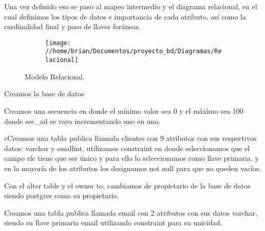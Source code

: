 \documentclass[letterpaper,12pt]{article}
\begin{document}
 	Una vez definido eso se paso al mapeo intermedio y el diagrama relacional, en el cual definimos los tipos de datos e importancia de cada atributo, así como la cardinalidad final y paso de llaves foráneas.
 	
 	\begin{figure}[H]

 		\begin{subfigure}{20cm}

 			\centering

 			\texttt{[image: //home/brian/Documentos/proyecto\_bd/Diagramas/Relacional]}

 		\end{subfigure}

 		\caption{Modelo Relacional.}
 	\end{figure}
 
 	Creamos la base de datos
 	
 	

 	
 	Creamos una secuencia en donde el mínimo valor sea 0 y el máximo sea 100 donde sec\_ad se vaya incrementando uno en uno.
 	
 	
 	
 	cCreamos una tabla publica llamada clientes con 9 atributos con sus respectivos datos: varchar y smallint, utilizamos constraint en donde seleccionamos que el campo rfc tiene que ser único y para ello lo seleccionamos como llave primaria.
 	y en la mayoría de los atributos los designamos not null para que no queden vacíos.
 	
 	
 	
 	Con el alter table y el owner to, cambiamos de propietario de la base de datos siendo postgres como su propietario.

 	
	
	Creamos una tabla publica llamada email con 2 atributos con sus datos varchar, siendo su llave primaria email utilizando constraint para su unicidad.\\
	
	
	
\end{document}
